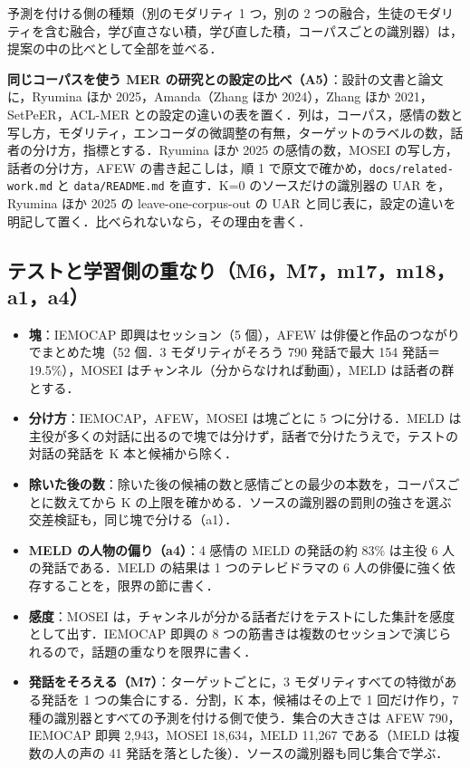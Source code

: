 \documentclass[11pt,a4paper]{ltjsarticle}
\begin{document}
予測を付ける側の種類（別のモダリティ 1 つ，別の 2 つの融合，生徒のモダリティを含む融合，学び直さない積，学び直した積，コーパスごとの識別器）は，提案の中の比べとして全部を並べる．

\textbf{同じコーパスを使う MER の研究との設定の比べ（A5）}：設計の文書と論文に，Ryumina ほか 2025，Amanda（Zhang ほか 2024），Zhang ほか 2021，SetPeER，ACL-MER との設定の違いの表を置く．列は，コーパス，感情の数と写し方，モダリティ，エンコーダの微調整の有無，ターゲットのラベルの数，話者の分け方，指標とする．Ryumina ほか 2025 の感情の数，MOSEI の写し方，話者の分け方，AFEW の書き起こしは，順 1 で原文で確かめ，\texttt{docs/related-work.md} と \texttt{data/README.md} を直す．K=0 のソースだけの識別器の UAR を，Ryumina ほか 2025 の leave-one-corpus-out の UAR と同じ表に，設定の違いを明記して置く．比べられないなら，その理由を書く．

\subsection{テストと学習側の重なり（M6，M7，m17，m18，a1，a4）}

\begin{itemize}
  \item \textbf{塊}：IEMOCAP 即興はセッション（5 個），AFEW は俳優と作品のつながりでまとめた塊（52 個．3 モダリティがそろう 790 発話で最大 154 発話＝19.5\%），MOSEI はチャンネル（分からなければ動画），MELD は話者の群とする．
  \item \textbf{分け方}：IEMOCAP，AFEW，MOSEI は塊ごとに 5 つに分ける．MELD は主役が多くの対話に出るので塊では分けず，話者で分けたうえで，テストの対話の発話を K 本と候補から除く．
  \item \textbf{除いた後の数}：除いた後の候補の数と感情ごとの最少の本数を，コーパスごとに数えてから K の上限を確かめる．ソースの識別器の罰則の強さを選ぶ交差検証も，同じ塊で分ける（a1）．
  \item \textbf{MELD の人物の偏り（a4）}：4 感情の MELD の発話の約 83\% は主役 6 人の発話である．MELD の結果は 1 つのテレビドラマの 6 人の俳優に強く依存することを，限界の節に書く．
  \item \textbf{感度}：MOSEI は，チャンネルが分かる話者だけをテストにした集計を感度として出す．IEMOCAP 即興の 8 つの筋書きは複数のセッションで演じられるので，話題の重なりを限界に書く．
  \item \textbf{発話をそろえる（M7）}：ターゲットごとに，3 モダリティすべての特徴がある発話を 1 つの集合にする．分割，K 本，候補はその上で 1 回だけ作り，7 種の識別器とすべての予測を付ける側で使う．集合の大きさは AFEW 790，IEMOCAP 即興 2,943，MOSEI 18,634，MELD 11,267 である（MELD は複数の人の声の 41 発話を落とした後）．ソースの識別器も同じ集合で学ぶ．
\end{itemize}
\end{document}
